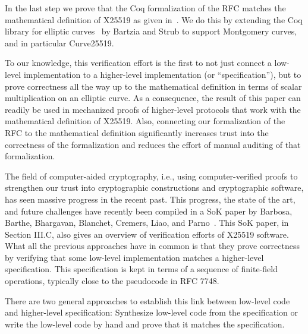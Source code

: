 In the last step we prove that the Coq formalization of the RFC matches
the mathematical definition of X25519 as given in~\cite[Sec.~2]{Ber06}.
We do this by extending the Coq library
for elliptic curves~\cite{BartziaS14} by Bartzia and Strub to
support Montgomery curves, and in particular Curve25519.

To our knowledge, this verification effort is the first to not just
connect a low-level implementation to a higher-level implementation (or ``specification''),
but to prove correctness all the way up
to the mathematical definition in terms of scalar multiplication on an elliptic curve.
As a consequence, the result of this paper can readily be used in mechanized proofs of
higher-level protocols that work with the mathematical definition of X25519.
Also, connecting our formalization of the RFC to the mathematical definition
significantly increases trust into the correctness of the formalization and
reduces the effort of manual auditing of that formalization.

The field of computer-aided cryptography, i.e., using computer-verified proofs
to strengthen our trust into cryptographic constructions and cryptographic software,
has seen massive progress in the recent past. This progress, the state of the art,
and future challenges have recently been compiled in a SoK paper by Barbosa,
Barthe, Bhargavan, Blanchet, Cremers, Liao, and Parno~\cite{BBB+19}.
This SoK paper, in Section III.C, also gives an overview of verification efforts of
X25519 software. What all the previous approaches have in common is that they
prove correctness by verifying that some low-level implementation matches a
higher-level specification. This specification is kept in terms of a sequence
of finite-field operations, typically close to the pseudocode in RFC 7748.

There are two general approaches to establish this link
between low-level code and higher-level specification:
Synthesize low-level code from the specification
or write the low-level code by hand and prove that it
matches the specification.



%


